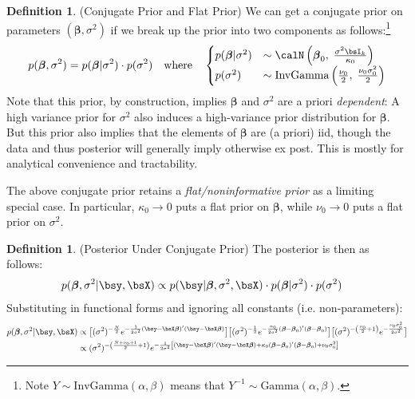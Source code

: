 \documentclass[12pt]{article}
\theoremstyle{plain}
\theoremstyle{definition}
\newtheorem{defn}[thm]{Definition}
\theoremstyle{remark}
\newcommand{\ra}{\rightarrow}
\newcommand{\bsbeta}{\boldsymbol{\beta}}
\begin{document}
\begin{defn}(Conjugate Prior and Flat Prior)
We can get a conjugate prior on parameters $(\bsbeta,\sigma^2)$ if we
break up the prior into two components as follows:\footnote{%
  Note $Y\sim \text{InvGamma}(\alpha,\beta)$ means that
  $Y^{-1}\sim\text{Gamma}(\alpha,\beta)$.
}
\begin{align*}
  p(\bsbeta,\sigma^2)
  =
  p(\bsbeta|\sigma^2)\cdot p(\sigma^2)
  \quad\text{where}\quad
  \begin{cases}
  p(\bsbeta|\sigma^2)
  &\sim
  \calN\left(\bsbeta_0, \; \frac{\sigma^2\bsI_k}{\kappa_0}
  \right)
  \\
  p(\sigma^2)
  &\sim \text{InvGamma}\left(
  \frac{\nu_0}{2},
  \; \frac{\nu_0\sigma^2_0}{2}
  \right)
  \end{cases}
\end{align*}
Note that this prior, by construction, implies $\bsbeta$ and $\sigma^2$
are a priori \emph{dependent}: A high variance prior for $\sigma^2$ also
induces a high-variance prior distribution for $\bsbeta$.
But this prior also implies that the elements of $\bsbeta$ are (a
priori) iid, though the data and thus posterior will generally imply
otherwise ex post.
This is mostly for analytical convenience and tractability.

The above conjugate prior retains a \emph{flat/noninformative prior} as
a limiting special case.
In particular, $\kappa_0\ra0$ puts a flat prior on $\bsbeta$, while
$\nu_0\ra 0$ puts a flat prior on $\sigma^2$.
\end{defn}


\begin{defn}(Posterior Under Conjugate Prior)
\label{defn:posteriornormal}
The posterior is then as follows:
\begin{align*}
   p(\bsbeta, \sigma^2 | \bsy,\bsX)
   &\propto
   p(\bsy|\bsbeta,\sigma^2,\bsX)\cdot p(\bsbeta|\sigma^2)\cdot p(\sigma^2)
\end{align*}
Substituting in functional forms and ignoring all constants (i.e.
non-parameters):
\begin{align*}
  p(\bsbeta, \sigma^2 | \bsy,\bsX)
  &\propto
  \big[
  (\sigma^2)^{-\frac{N}{2}}
  e^{-\frac{1}{2\sigma^2}(\bsy-\bsX\bsbeta)'(\bsy-\bsX\bsbeta)}
  \big]
  \big[
  (\sigma^2)^{-\frac{1}{2}}
  e^{-\frac{\kappa_0}{2\sigma^2}(\bsbeta-\bsbeta_0)'(\bsbeta-\bsbeta_0)}
  \big]
  \big[
    (\sigma^2)^{-\left(\frac{\nu_0}{2}+1\right)}
    e^{-\frac{\nu_0\sigma_0^2}{2\sigma^2}}
  \big]
  \\
  &\propto
  (\sigma^2)^{-\left(\frac{N+\nu_0+1}{2}+1\right)}
  e^{%
    -\frac{1}{2\sigma^2}
    \left[
    (\bsy-\bsX\bsbeta)'(\bsy-\bsX\bsbeta)
    + \kappa_0(\bsbeta-\bsbeta_0)'(\bsbeta-\bsbeta_0)
    +\nu_0\sigma^2_0
    \right]
  }
\end{align*}
\end{defn}
\end{document}
